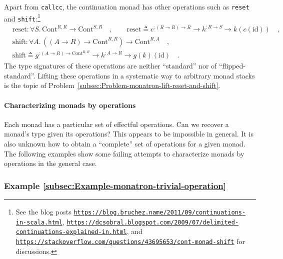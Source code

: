 Apart from \lstinline!callcc!, the continuation monad has other operations
such as \lstinline!reset! and \lstinline!shift!:\footnote{See the blog posts \texttt{\href{https://blog.bruchez.name/2011/09/continuations-in-scala.html}{https://blog.bruchez.name/2011/09/continuations-in-scala.html}},
\texttt{\href{https://dcsobral.blogspot.com/2009/07/delimited-continuations-explained-in.html}{https://dcsobral.blogspot.com/2009/07/delimited-continuations-explained-in.html}},
and \texttt{\href{https://stackoverflow.com/questions/43695653/cont-monad-shift}{https://stackoverflow.com/questions/43695653/cont-monad-shift}}
for discussions.}
\begin{align*}
 & \text{reset}:\forall S.\,\text{Cont}^{R,R}\rightarrow\text{Cont}^{S,R}\quad,\quad\quad\text{reset}\triangleq c^{:\left(R\rightarrow R\right)\rightarrow R}\rightarrow k^{:R\rightarrow S}\rightarrow k(c(\text{id}))\quad,\\
 & \text{shift}:\forall A.\,((A\rightarrow R)\rightarrow\text{Cont}^{R,R})\rightarrow\text{Cont}^{R,A}\quad,\\
 & \text{shift}\triangleq g^{:\left(A\rightarrow R\right)\rightarrow\text{Cont}^{R,R}}\rightarrow k^{:A\rightarrow R}\rightarrow g(k)(\text{id})\quad.
\end{align*}
The type signatures of these operations are neither \textsf{``}standard\textsf{''}
nor of \textsf{``}flipped-standard\textsf{''}. Lifting these operations in a systematic
way to arbitrary monad stacks is the topic of Problem~\ref{subsec:Problem-monatron-lift-reset-and-shift}.

\paragraph{Characterizing monads by operations}

Each monad has a particular set of effectful operations. Can we recover
a monad\textsf{'}s type given its operations? This appears to be impossible
in general. It is also unknown how to obtain a \textsf{``}complete\textsf{''} set
of operations for a given monad. The following examples show some
failing attempts to characterize monads by operations in the general
case.

\subsubsection{Example \label{subsec:Example-monatron-trivial-operation}\ref{subsec:Example-monatron-trivial-operation}}

